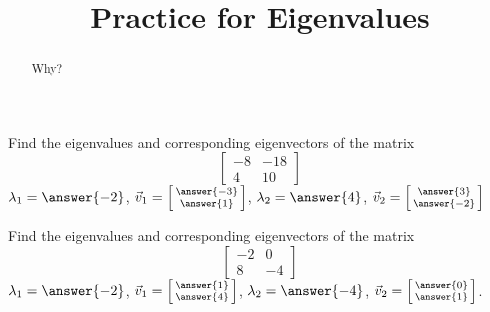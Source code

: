 \documentclass{ximera}
\title{Practice for Eigenvalues}
\begin{document}
\begin{abstract}
Why?
\end{abstract}
\maketitle


\begin{exercise}%
    Find the eigenvalues and corresponding eigenvectors of the matrix 
    \[ 
        \begin{bmatrix} 
        -8 & -18 \\ 
        4 & 10 
        \end{bmatrix} 
    \]
    $\lambda_1 = \answer{-2}$, $\vec{v}_1 = \left[\begin{smallmatrix} \answer{-3} \\ \answer{1} \end{smallmatrix}\right]$, $\lambda_2 = \answer{4}$, $\vec{v}_2 = \left[\begin{smallmatrix} \answer{3} \\ \answer{-2} \end{smallmatrix}\right]$
\end{exercise}

\begin{exercise}%
    Find the eigenvalues and corresponding eigenvectors of the matrix 
    \[ 
        \begin{bmatrix} 
        -2 & 0 \\ 
        8 & -4 
        \end{bmatrix} 
    \]
    $\lambda_1 = \answer{-2}$, $\vec{v}_1 = \left[\begin{smallmatrix} \answer{1} \\ \answer{4} \end{smallmatrix}\right]$, $\lambda_2 = \answer{-4}$, $\vec{v}_2 = \left[\begin{smallmatrix} \answer{0} \\ \answer{1} \end{smallmatrix}\right]$. 
\end{exercise}
\end{document}
